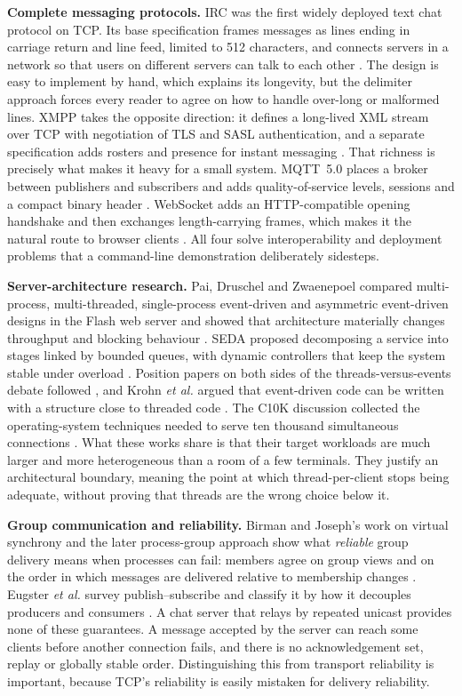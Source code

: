 \documentclass[conference]{IEEEtran}
\begin{document}
\textbf{Complete messaging protocols.} IRC was the first widely deployed text chat protocol on TCP. Its base specification frames messages as lines ending in carriage return and line feed, limited to 512 characters, and connects servers in a network so that users on different servers can talk to each other \cite{rfc1459,rfc2812}. The design is easy to implement by hand, which explains its longevity, but the delimiter approach forces every reader to agree on how to handle over-long or malformed lines. XMPP takes the opposite direction: it defines a long-lived XML stream over TCP with negotiation of TLS and SASL authentication, and a separate specification adds rosters and presence for instant messaging \cite{rfc6120,rfc6121}. That richness is precisely what makes it heavy for a small system. MQTT~5.0 places a broker between publishers and subscribers and adds quality-of-service levels, sessions and a compact binary header \cite{mqtt5}. WebSocket adds an HTTP-compatible opening handshake and then exchanges length-carrying frames, which makes it the natural route to browser clients \cite{rfc6455}. All four solve interoperability and deployment problems that a command-line demonstration deliberately sidesteps.

\textbf{Server-architecture research.} Pai, Druschel and Zwaenepoel compared multi-process, multi-threaded, single-process event-driven and asymmetric event-driven designs in the Flash web server and showed that architecture materially changes throughput and blocking behaviour \cite{flash}. SEDA proposed decomposing a service into stages linked by bounded queues, with dynamic controllers that keep the system stable under overload \cite{seda}. Position papers on both sides of the threads-versus-events debate followed \cite{ousterhout,vonbehren,lee}, and Krohn \emph{et al.} argued that event-driven code can be written with a structure close to threaded code \cite{krohn}. The C10K discussion collected the operating-system techniques needed to serve ten thousand simultaneous connections \cite{kegel}. What these works share is that their target workloads are much larger and more heterogeneous than a room of a few terminals. They justify an architectural boundary, meaning the point at which thread-per-client stops being adequate, without proving that threads are the wrong choice below it.

\textbf{Group communication and reliability.} Birman and Joseph's work on virtual synchrony and the later process-group approach show what \emph{reliable} group delivery means when processes can fail: members agree on group views and on the order in which messages are delivered relative to membership changes \cite{birman87,birman93}. Eugster \emph{et al.} survey publish--subscribe and classify it by how it decouples producers and consumers \cite{eugster}. A chat server that relays by repeated unicast provides none of these guarantees. A message accepted by the server can reach some clients before another connection fails, and there is no acknowledgement set, replay or globally stable order. Distinguishing this from transport reliability is important, because TCP's reliability is easily mistaken for delivery reliability.
\end{document}
